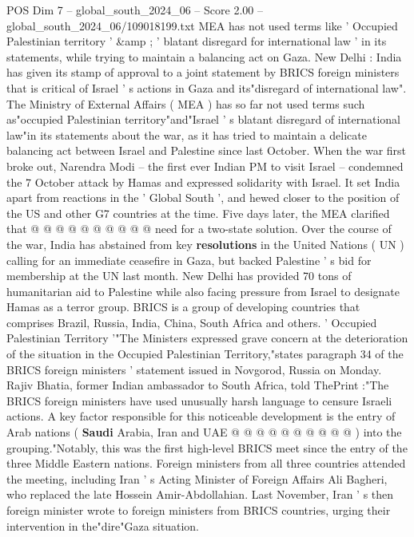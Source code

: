 \begin{textsample}{POS Dim 7 – global\_south\_2024\_06 – Score 2.00 – global\_south\_2024\_06/109018199.txt}  \label{ex:f7_pos_087}
MEA has not used terms like ' Occupied Palestinian territory ' \&amp ; ' blatant disregard for international law ' in its statements, while trying to maintain a balancing act on Gaza.
New Delhi : India has given its stamp of approval to a joint statement by BRICS foreign ministers that is critical of Israel ' s actions in Gaza and its"disregard of international law".
The Ministry of External Affairs ( MEA ) has so far not used terms such as"occupied Palestinian territory"and"Israel ' s blatant disregard of international law"in its statements about the war, as it has tried to maintain a delicate balancing act between Israel and Palestine since last October.
When the war first broke out, Narendra Modi -- the first ever Indian PM to visit Israel -- condemned the 7 October attack by Hamas and expressed solidarity with Israel.
It set India apart from reactions in the ' Global South ', and hewed closer to the position of the US and other G7 countries at the time.
Five days later, the MEA clarified that @ @ @ @ @ @ @ @ @ @ need for a two-state solution.
Over the course of the war, India has abstained from key \textbf{resolutions} in the United Nations ( UN ) calling for an immediate ceasefire in Gaza, but backed Palestine ' s bid for membership at the UN last month.
New Delhi has provided 70 tons of humanitarian aid to Palestine while also facing pressure from Israel to designate Hamas as a terror group.
BRICS is a group of developing countries that comprises Brazil, Russia, India, China, South Africa and others. ' Occupied Palestinian Territory '"The Ministers expressed grave concern at the deterioration of the situation in the Occupied Palestinian Territory,"states paragraph 34 of the BRICS foreign ministers ' statement issued in Novgorod, Russia on Monday.
Rajiv Bhatia, former Indian ambassador to South Africa, told ThePrint :"The BRICS foreign ministers have used unusually harsh language to censure Israeli actions.
A key factor responsible for this noticeable development is the entry of Arab nations ( \textbf{Saudi} Arabia, Iran and UAE @ @ @ @ @ @ @ @ @ @ ) into the grouping."Notably, this was the first high-level BRICS meet since the entry of the three Middle Eastern nations.
Foreign ministers from all three countries attended the meeting, including Iran ' s Acting Minister of Foreign Affairs Ali Bagheri, who replaced the late Hossein Amir-Abdollahian.
Last November, Iran ' s then foreign minister wrote to foreign ministers from BRICS countries, urging their intervention in the"dire"Gaza situation.

\end{textsample}
